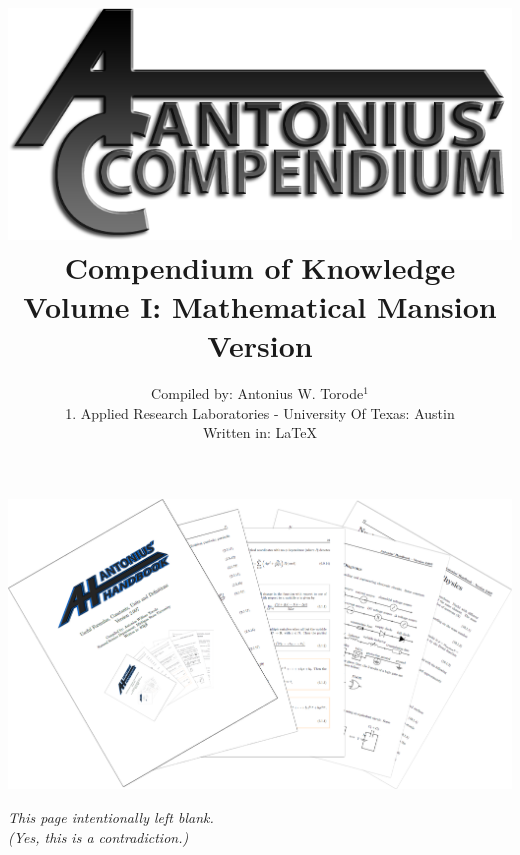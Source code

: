 \documentclass[openany,twoside, notitlepage,letterpaper,11pt]{book}
\title{\includegraphics[scale=2.5]{./Images/Covers/AC.png}
	\\ Compendium of Knowledge \\ Volume I: Mathematical Mansion \\ Version \Version}
\date{}
\author{Compiled by: Antonius W. Torode$^{1}$ \\ \scriptsize{1. Applied Research Laboratories - University Of Texas: Austin} \\ Written in: \LaTeX}
\begin{document}
\frontmatter
\maketitle
\thispagestyle{empty}
\pagestyle{empty}
\begin{center}	
	\includegraphics[scale=1.6]{./Images/Covers/background_tunnel.png}
\end{center}





\thispagestyle{empty}
\newpage
{}
\begin{center}
	\textit{This page intentionally left blank.\\ (Yes, this is a contradiction.)}
\end{center}

\tableofcontents


\setlength{\parindent}{0pt}
\mainmatter
\pagestyle{fancy}

\setlength{\parindent}{25pt}

\newpage


\newpage


\newpage


\newpage


\newpage


\newpage

\end{document}

